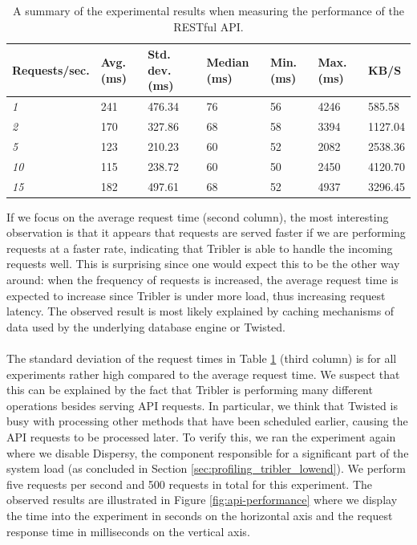 \begin{table}[]
	\centering
	\begin{tabular}{|l|l|l|l|l|l|l|}
		\hline
		\textbf{Requests/sec.} & \textbf{Avg. (ms)} & \textbf{Std. dev. (ms)} & \textbf{Median (ms)} & \textbf{Min. (ms)} & \textbf{Max. (ms)} & \textbf{KB/S} \\ \hline
		\emph{1} & 241 & 476.34 & 76 & 56 & 4246 & 585.58\\ \hline
		\emph{2} & 170 & 327.86 & 68 & 58 & 3394 & 1127.04\\ \hline
		\emph{5} & 123 & 210.23 & 60 & 52 & 2082 & 2538.36\\ \hline
		\emph{10} & 115 & 238.72 & 60 & 50 & 2450 & 4120.70\\ \hline
		\emph{15} & 182 & 497.61 & 68 & 52 & 4937 & 3296.45\\ \hline
	\end{tabular}
	\caption{A summary of the experimental results when measuring the performance of the RESTful API.}
	\label{table:performance-api-results}
\end{table}

\noindent If we focus on the average request time (second column), the most interesting observation is that it appears that requests are served faster if we are performing requests at a faster rate, indicating that Tribler is able to handle the incoming requests well. This is surprising since one would expect this to be the other way around: when the frequency of requests is increased, the average request time is expected to increase since Tribler is under more load, thus increasing request latency. The observed result is most likely explained by caching mechanisms of data used by the underlying database engine or Twisted.\\\\
The standard deviation of the request times in Table \ref{table:performance-api-results} (third column) is for all experiments rather high compared to the average request time. We suspect that this can be explained by the fact that Tribler is performing many different operations besides serving API requests. In particular, we think that Twisted is busy with processing other methods that have been scheduled earlier, causing the API requests to be processed later. To verify this, we ran the experiment again where we disable Dispersy, the component responsible for a significant part of the system load (as concluded in Section \ref{sec:profiling_tribler_lowend}). We perform five requests per second and 500 requests in total for this experiment. The observed results are illustrated in Figure \ref{fig:api-performance} where we display the time into the experiment in seconds on the horizontal axis and the request response time in milliseconds on the vertical axis.\\

